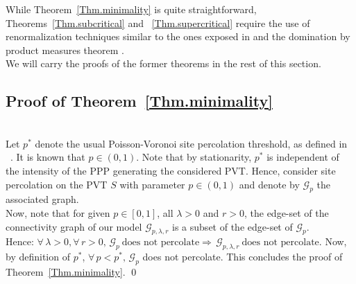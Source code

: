 \documentclass[10pt,a4paper]{amsart}
\theoremstyle{exampstyle}
\theoremstyle{exampnotations}
\begin{document}
While Theorem~\ref{Thm.minimality} is quite straightforward, Theorems~\ref{Thm.subcritical} and ~\ref{Thm.supercritical} require the use of renormalization techniques similar to the ones exposed in \cite{hirsch2018continuum} and the domination by product measures theorem \cite[Theorem 0.0]{liggett_domination_1997}. \\
We will carry the proofs of the former theorems in the rest of this section.

\subsection{Proof of Theorem~\ref{Thm.minimality}}\mbox{}\\
\indent Let $p^*$ denote the usual Poisson-Voronoi site percolation threshold, as defined in ~\cite{becker_percolation_2009,neher2008topological}. It is known that $p \in \left(0,1\right)$. Note that by stationarity, $p^*$ is independent of the intensity of the PPP generating the considered PVT. Hence, consider site percolation on the PVT $S$ with parameter $p \in \left(0,1\right)$ and denote by $\mathcal{G}_p$ the associated graph. \\
Now, note that for given $p \in \left[0,1\right]$, all $\lambda >0$ and $r>0$, the edge-set of the connectivity graph of our model $\mathcal{G}_{p,\lambda,r}$ is a subset of the edge-set of $\mathcal{G}_p$. 
\\Hence: $\forall \, \lambda >0, \forall \, r>0, \, \mathcal{G}_{p} \ \text{does not percolate} \Rightarrow \, \mathcal{G}_{p,\lambda,r} \ \text{does not percolate}$.
Now, by definition of $p^*$, $\forall \, p < p^*, \, \mathcal{G}_p$ does not percolate. This concludes the proof of Theorem~\ref{Thm.minimality}. \qed
\\
\end{document}
